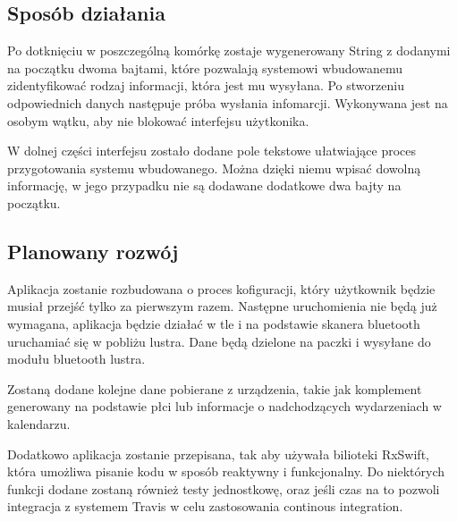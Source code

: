 \documentclass[a4paper,11pt]{article}
\begin{document}
\subsection{Sposób działania}
Po dotknięciu w poszczególną komórkę zostaje wygenerowany String z dodanymi na początku dwoma bajtami, które pozwalają systemowi wbudowanemu zidentyfikować rodzaj informacji, która jest mu wysyłana. Po stworzeniu odpowiednich danych następuje próba wysłania infomarcji. Wykonywana jest na osobym wątku, aby nie blokować interfejsu użytkonika.

W dolnej części interfejsu zostało dodane pole tekstowe ułatwiające proces przygotowania systemu wbudowanego. Można dzięki niemu wpisać dowolną informację, w jego przypadku nie są dodawane dodatkowe dwa bajty na początku.

\subsection{Planowany rozwój}

Aplikacja zostanie rozbudowana o proces kofiguracji, który użytkownik będzie musiał przejść tylko za pierwszym razem. Następne uruchomienia nie będą już wymagana, aplikacja będzie działać w tle i na podstawie skanera bluetooth uruchamiać się w pobliżu lustra. Dane będą dzielone na paczki i wysyłane do modułu bluetooth lustra.

Zostaną dodane kolejne dane pobierane z urządzenia, takie jak komplement generowany na podstawie płci lub informacje o nadchodzących wydarzeniach w kalendarzu.

Dodatkowo aplikacja zostanie przepisana, tak aby używała bilioteki RxSwift, która umożliwa pisanie kodu w sposób reaktywny i funkcjonalny. Do niektórych funkcji dodane zostaną również testy jednostkowę, oraz jeśli czas na to pozwoli integracja z systemem Travis w celu zastosowania continous integration.
	
\end{document}
